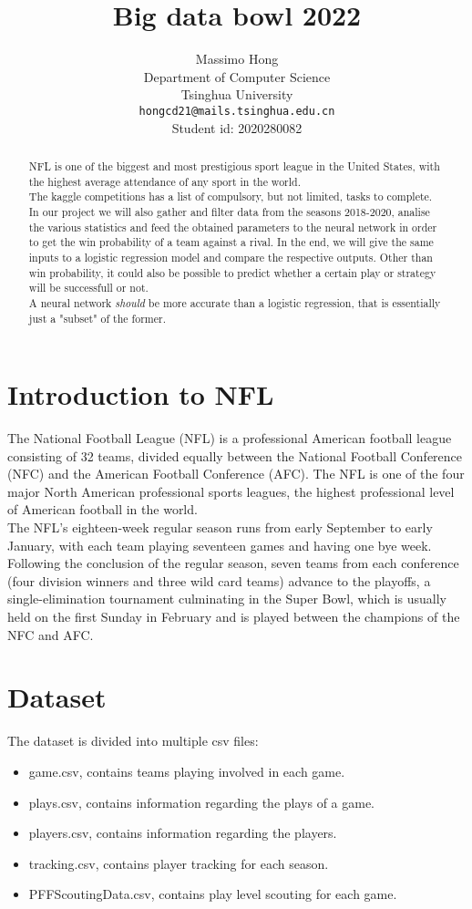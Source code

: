 \documentclass{article}
\title{Big data bowl 2022}
\author{
  Massimo Hong\\
  Department of Computer Science\\
  Tsinghua University\\
  \texttt{hongcd21@mails.tsinghua.edu.cn} \\
  Student id: 2020280082}
\begin{document}
\maketitle

\begin{abstract}
  NFL is one of the biggest and most prestigious sport league in the United States, with the highest average attendance of any sport in the world. \\
The kaggle competitions has a list of compulsory, but not limited, tasks to complete. In our project we will also gather and filter data from the seasons 2018-2020, analise the various statistics and feed the obtained parameters to the neural network in order to get the win probability of a team against a rival. In the end, we will give the same inputs to a logistic regression model and compare the respective outputs. Other than win probability, it could also be possible to predict whether a certain play or strategy will be successfull or not. \\
A neural network \textit{should} be more accurate than a logistic regression, that is essentially just a "subset" of the former. 
\end{abstract}
\section{Introduction to NFL}
The National Football League (NFL) is a professional American football league consisting of 32 teams, divided equally between the National Football Conference (NFC) and the American Football Conference (AFC). The NFL is one of the four major North American professional sports leagues, the highest professional level of American football in the world. \\
The NFL's eighteen-week regular season runs from early September to early January, with each team playing seventeen games and having one bye week. Following the conclusion of the regular season, seven teams from each conference (four division winners and three wild card teams) advance to the playoffs, a single-elimination tournament culminating in the Super Bowl, which is usually held on the first Sunday in February and is played between the champions of the NFC and AFC\cite{NFL_Wiki}.
\section{Dataset}
The dataset is divided into multiple csv files:
\begin{itemize}
\item game.csv, contains teams playing involved in each game.
\item plays.csv, contains  information regarding the plays of a game.
\item players.csv, contains information regarding the players.
\item tracking.csv, contains player tracking for each season.
\item PFFScoutingData.csv, contains play level scouting for each game.
\end{itemize}
\end{document}
